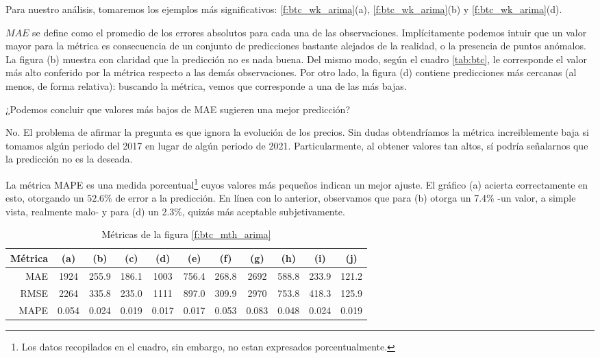 \documentclass[a4paper,10pt]{article}
\begin{document}
Para nuestro análisis, tomaremos los ejemplos más significativos: \ref{f:btc_wk_arima}(a), \ref{f:btc_wk_arima}(b) y \ref{f:btc_wk_arima}(d).

$MAE$ se define como el promedio de los errores absolutos para cada una de las observaciones. Implícitamente podemos intuir que un valor mayor para la métrica es consecuencia de un conjunto de predicciones bastante alejados de la realidad, o la presencia de puntos anómalos. La figura (b) muestra con claridad que la predicción no es nada buena. Del mismo modo, según el cuadro \ref{tab:btc}, le corresponde el valor más alto conferido por la métrica respecto a las demás observaciones. Por otro lado, la figura (d) contiene predicciones más cercanas (al menos, de forma relativa): buscando la métrica, vemos que corresponde a una de las más bajas.

¿Podemos concluir que valores más bajos de MAE sugieren una mejor predicción?

No. El problema de afirmar la pregunta es que ignora la evolución de los precios. Sin dudas obtendríamos la métrica increiblemente baja si tomamos algún periodo del 2017 en lugar de algún periodo de 2021. Particularmente, al obtener valores tan altos, sí podría señalarnos que la predicción no es la deseada.

La métrica MAPE es una medida porcentual\footnote{Los datos recopilados en el cuadro, sin embargo, no estan expresados porcentualmente.} cuyos valores más pequeños indican un mejor ajuste. El gráfico (a) acierta correctamente en esto, otorgando un $52.6\%$ de error a la predicción. En línea con lo anterior, observamos que para (b) otorga un 7.4\% -un valor, a simple vista, realmente malo- y para (d) un 2.3\%, quizás más aceptable subjetivamente.

\begin{table}[H]
 \begin{center}
 \resizebox{12cm}{!} {
  \begin{tabular}{|r|c|c|c|c|c|c|c|c|c|c|}
    Métrica & (a) & (b) & (c) & (d) & (e) & (f) & (g) & (h) & (i) & (j) \\ \hline
    MAE & 1924 & 255.9 & 186.1 & 1003 & 756.4 & 268.8 & 2692 & 588.8 & 233.9 & 121.2 \\
    RMSE & 2264 & 335.8 & 235.0 & 1111 & 897.0 & 309.9 & 2970 & 753.8 & 418.3 & 125.9 \\
    MAPE & 0.054 & 0.024 & 0.019 & 0.017 & 0.017 & 0.053 & 0.083 & 0.048 & 0.024 & 0.019 \\ \hline
  \end{tabular}
  }
  \caption{Métricas de la figura \ref{f:btc_mth_arima}}
  \label{tab:btc_wk}
 \end{center}
\end{table}
\end{document}
